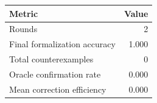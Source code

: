 \begin{tabular}{lr}
\toprule
Metric & Value \\
\midrule
Rounds & 2 \\
Final formalization accuracy & 1.000 \\
Total counterexamples & 0 \\
Oracle confirmation rate & 0.000 \\
Mean correction efficiency & 0.000 \\
\bottomrule
\end{tabular}
